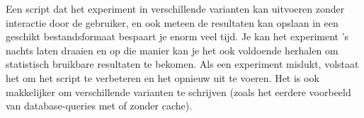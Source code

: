 Een script dat het experiment in verschillende varianten kan uitvoeren zonder interactie door de gebruiker, en ook meteen de resultaten kan opslaan in een geschikt bestandsformaat bespaart je enorm veel tijd. Je kan het experiment 's nachts laten draaien en op die manier kan je het ook voldoende herhalen om statistisch bruikbare resultaten te bekomen. Als een experiment mislukt, volstaat het om het script te verbeteren en het opnieuw uit te voeren. Het is ook makkelijker om verschillende varianten te schrijven (zoals het eerdere voorbeeld van database-queries met of zonder cache).



